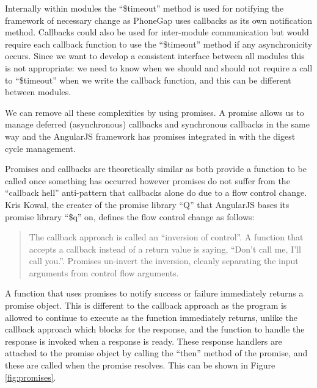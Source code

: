 Internally within modules the ``\$timeout'' method is used for
notifying the framework of necessary change as PhoneGap uses callbacks
as its own notification method. Callbacks could also be used for
inter-module communication but would require each callback function to
use the ``\$timeout'' method if any asynchronicity occurs. Since we
want to develop a consistent interface between all modules this is not
appropriate: we need to know when we should and should not require a
call to ``\$timeout'' when we write the callback function, and this
can be different between modules.

We can remove all these complexities by using promises. A promise
allows us to manage deferred (asynchronous) callbacks and synchronous
callbacks in the same way and the AngularJS framework has promises
integrated in with the digest cycle management. 

Promises and callbacks are theoretically similar as both provide a
function to be called once something has occurred however promises do
not suffer from the ``callback hell'' anti-pattern that callbacks
alone do due to a flow control change.
Kris Kowal, the creater of the promise library ``Q'' that
AngularJS bases its promise library ``\$q'' on, defines the flow
control change as follows:
\begin{quote}
The callback approach is called an ``inversion of control''. A function
that accepts a callback instead of a return value is saying, ``Don’t
call me, I’ll call you.''. Promises un-invert the inversion, cleanly
separating the input arguments from control flow arguments.\cite{kriskowalq}
\end{quote}

A function that uses promises to notify success or failure immediately
returns a promise object. This is different to the callback approach
as the program is allowed to continue to execute as the function
immediately returns, unlike the callback approach which blocks for the
response, and the function to handle the response is invoked when a
response is ready. These response handlers are attached to the promise
object by calling the ``then'' method of the promise, and these are
called when the promise resolves. This can be shown in Figure
\ref{fig:promises}. 

